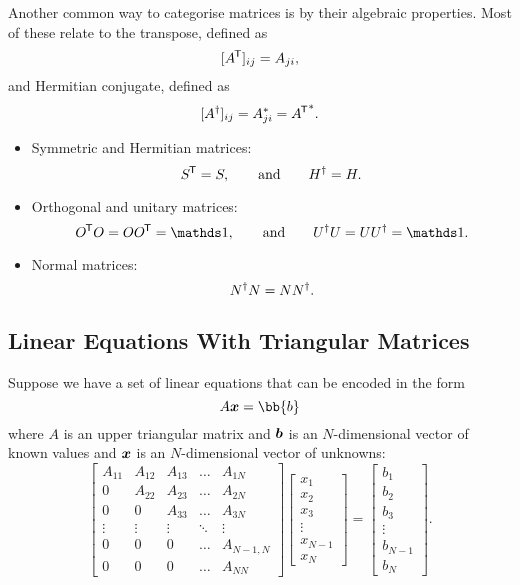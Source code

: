 \documentclass[a4paper]{article}
\begin{document}
    Another common way to categorise matrices is by their algebraic properties.
    Most of these relate to the transpose, defined as
    \[[A^{\mkern-1.5mu\mathsf{T}}]_{ij} = A_{ji},\]
    and Hermitian conjugate, defined as
    \[[A^\dagger]_{ij} = A_{ji}^* = {A^{\mkern-1.5mu\mathsf{T}}}^*.\]
    \begin{itemize}
        \item Symmetric and Hermitian matrices:
        \[S^{\mkern-1.5mu\mathsf{T}} = S,\qquad\text{and}\qquad H^\dagger = H.\]
        \item Orthogonal and unitary matrices:
        \[O\trans O = OO\trans = \ident,\qquad\text{and}\qquad U\hermit U = UU\hermit = \ident.\]
        \item Normal matrices:
        \[N^\dagger N = NN^\dagger.\]
    \end{itemize}

    \subsection{Linear Equations With Triangular Matrices}
    Suppose we have a set of linear equations that can be encoded in the form
    \[A\vv{x} = \bb{b}\]
    where \(A\) is an upper triangular matrix and \(\bm{b}\) is an \(N\)-dimensional vector of known values and \(\bm{x}\) is an \(N\)-dimensional vector of unknowns:
    \[
        \begin{bmatrix}
        	A_{11} & A_{12} & A_{13} & \dots  & A_{1N}    \\
        	0      & A_{22} & A_{23} & \dots  & A_{2N}    \\
        	0      & 0      & A_{33} & \dots  & A_{3N}    \\
        	\vdots & \vdots & \vdots & \ddots & \vdots    \\
        	0      & 0      & 0      & \dots  & A_{N-1,N} \\
        	0      & 0      & 0      & \dots  & A_{NN}
        \end{bmatrix}
        \begin{bmatrix}
            x_1\\ x_2\\ x_3\\ \vdots\\ x_{N-1}\\ x_N
        \end{bmatrix}
        =
        \begin{bmatrix}
            b_1\\ b_2\\ b_3\\ \vdots\\ b_{N-1}\\ b_N
        \end{bmatrix}
        .
    \]
\end{document}

